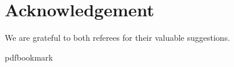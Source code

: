 \documentclass[11pt]{article}
\numberwithin{equation}{section}
\theoremstyle{definition}
\theoremstyle{plain}
\begin{document}
\section*{Acknowledgement}

We are grateful to both referees for their valuable suggestions.

\providecommand{\bibhead}[1]{}
\expandafter\ifx\csname pdfbookmark\endcsname\relax%
  \providecommand{\tocrefpdfbookmark}{}
\else\providecommand{\tocrefpdfbookmark}{%
   \hypertarget{tocreferences}{}%
   \pdfbookmark[1]{References}{tocreferences}}%
\fi

\tocrefpdfbookmark
\end{document}
